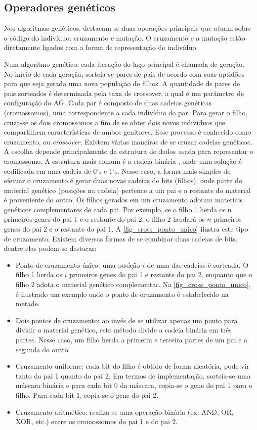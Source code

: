 \subsection{Operadores genéticos}
Nos algoritmos genéticos, destacam-se duas operações principais que atuam sobre o código do indivíduo: cruzamento e mutação. O cruzamento e a mutação estão diretamente ligados com a forma de representação do indivíduo.

Num algoritmo genético, cada iteração do laço principal é chamada de geração. No início de cada geração, sorteia-se pares de pais de acordo com suas aptidões para que seja gerada uma nova população de filhos. A quantidade de pares de pais sorteados é determinada pela taxa de crossover, a qual é um parâmetro de configuração do AG. Cada par é composto de duas cadeias genéticas (cromossomos), uma correspondente a cada indivíduo do par. Para gerar o filho, cruza-se os dois cromossomos a fim de se obter dois novos indivíduos que compartilhem características de ambos genitores. Esse processo é conhecido como cruzamento, ou \textit{crossover}. Existem várias maneiras de se cruzar cadeias genéticas. A escolha depende principalmente da estrutura de dados usada para representar o cromossomo. A estrutura mais comum é a cadeia binária \cite{Goldberg1989}, onde uma solução é codificada em uma cadeia de 0's e 1's. Nesse caso, a forma mais simples de efetuar o cruzamento é gerar duas novas cadeias de bits (filhos), onde parte do material genético (posições na cadeia) pertence a um pai e o restante do material é proveniente do outro. Os filhos gerados em um cruzamento adotam materiais genéticos complementares de cada pai. Por exemplo, se o filho 1 herda os n primeiros genes do pai 1 e o restante do pai 2, o filho 2 herdará os $n$ primeiros genes do pai 2 e o restante do pai 1. A \autoref{fig_cross_ponto_unico} ilustra este tipo de cruzamento. Existem diversas formas de se combinar duas cadeias de bits, dentre elas podem-se destacar:

\begin{itemize}  
	\item Ponto de cruzamento único: uma posição $i$ de uma das cadeias é sorteada. O filho 1 herda os $i$ primeiros genes do pai 1 e restante do pai 2, enquanto que o filho 2 adota o material genético complementar. Na \autoref{fig_cross_ponto_unico}, é ilustrado um exemplo onde o ponto de cruzamento é estabelecido na metade.
	\item Dois pontos de cruzamento: ao invés de se utilizar apenas um ponto para dividir o material genético, este método divide a cadeia binária em três partes. Nesse caso, um filho herda a primeira e terceira partes de um pai e a segunda do outro.
	\item Cruzamento uniforme: cada bit do filho é obtido de forma aleatória, pode vir tanto do pai 1 quanto do pai 2. Em termos de implementação, sorteia-se uma máscara binária e para cada bit 0 da máscara, copia-se o gene do pai 1 para o filho. Para cada bit 1, copia-se o gene do pai 2.
	\item Cruzamento aritmético: realiza-se uma operação binária (ex: AND, OR, XOR, etc.) entre os cromossomos do pai 1 e do pai 2.
\end{itemize}

